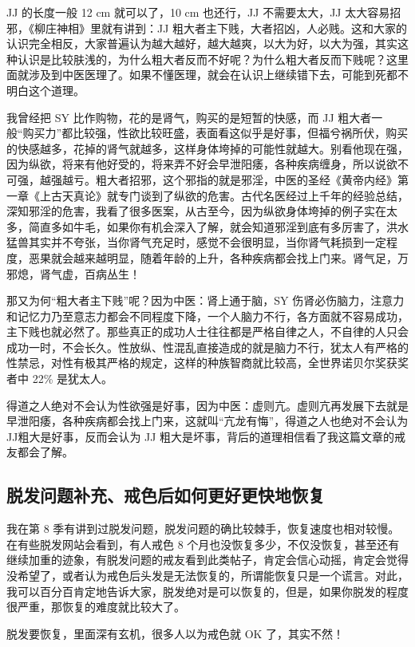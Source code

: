 \documentclass[fontset=founder]{ctexart}
\begin{document}
JJ 的长度一般 12 cm 就可以了，10 cm 也还行，JJ 不需要太大，JJ 太大容易招邪，《柳庄神相》里就有讲到：JJ 粗大者主下贱，大者招凶，人必贱。这和大家的认识完全相反，大家普遍认为越大越好，越大越爽，以大为好，以大为强，其实这种认识是比较肤浅的，为什么粗大者反而不好呢？为什么粗大者反而下贱呢？这里面就涉及到中医医理了。如果不懂医理，就会在认识上继续错下去，可能到死都不明白这个道理。

我曾经把 SY 比作购物，花的是肾气，购买的是短暂的快感，而 JJ 粗大者一般“购买力”都比较强，性欲比较旺盛，表面看这似乎是好事，但福兮祸所伏，购买的快感越多，花掉的肾气就越多，这样身体垮掉的可能性就越大。别看他现在强，因为纵欲，将来有他好受的，将来弄不好会早泄阳痿，各种疾病缠身，所以说欲不可强，越强越亏。粗大者招邪，这个邪指的就是邪淫，中医的圣经《黄帝内经》第一章《上古天真论》就专门谈到了纵欲的危害。古代名医经过上千年的经验总结，深知邪淫的危害，我看了很多医案，从古至今，因为纵欲身体垮掉的例子实在太多，简直多如牛毛，如果你有机会深入了解，就会知道邪淫到底有多厉害了，洪水猛兽其实并不夸张，当你肾气充足时，感觉不会很明显，当你肾气耗损到一定程度，恶果就会越来越明显，随着年龄的上升，各种疾病都会找上门来。肾气足，万邪熄，肾气虚，百病丛生！

那又为何“粗大者主下贱”呢？因为中医：肾上通于脑，SY 伤肾必伤脑力，注意力和记忆力乃至意志力都会不同程度下降，一个人脑力不行，各方面就不容易成功，主下贱也就必然了。那些真正的成功人士往往都是严格自律之人，不自律的人只会成功一时，不会长久。性放纵、性混乱直接造成的就是脑力不行，犹太人有严格的性禁忌，对性有极其严格的规定，这样的种族智商就比较高，全世界诺贝尔奖获奖者中 22\% 是犹太人。

得道之人绝对不会认为性欲强是好事，因为中医：虚则亢。虚则亢再发展下去就是早泄阳痿，各种疾病都会找上门来，这就叫“亢龙有悔”，得道之人也绝对不会认为JJ粗大是好事，反而会认为 JJ 粗大是坏事，背后的道理相信看了我这篇文章的戒友都会了解。

\subsection{脱发问题补充、戒色后如何更好更快地恢复}

我在第 8 季有讲到过脱发问题，脱发问题的确比较棘手，恢复速度也相对较慢。在有些脱发网站会看到，有人戒色 8 个月也没恢复多少，不仅没恢复，甚至还有继续加重的迹象，有脱发问题的戒友看到此类帖子，肯定会信心动摇，肯定会觉得没希望了，或者认为戒色后头发是无法恢复的，所谓能恢复只是一个谎言。对此，我可以百分百肯定地告诉大家，脱发绝对是可以恢复的，但是，如果你脱发的程度很严重，那恢复的难度就比较大了。

脱发要恢复，里面深有玄机，很多人以为戒色就 OK 了，其实不然！
\end{document}
